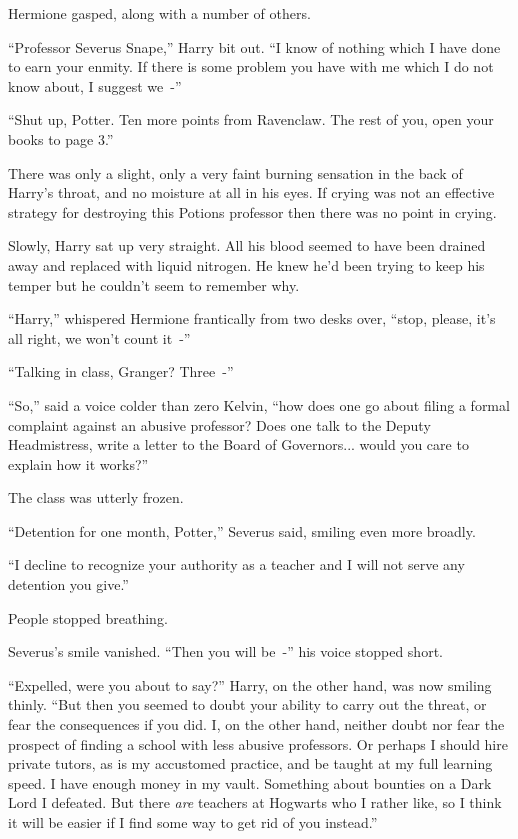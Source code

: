 Hermione gasped, along with a number of others.

``Professor Severus Snape,'' Harry bit out. ``I know of nothing which I have done to earn your enmity. If there is some problem you have with me which I do not know about, I suggest we~-''

``Shut up, Potter. Ten more points from Ravenclaw. The rest of you, open your books to page 3.''

There was only a slight, only a very faint burning sensation in the back of Harry's throat, and no moisture at all in his eyes. If crying was not an effective strategy for destroying this Potions professor then there was no point in crying.

Slowly, Harry sat up very straight. All his blood seemed to have been drained away and replaced with liquid nitrogen. He knew he'd been trying to keep his temper but he couldn't seem to remember why.

``Harry,'' whispered Hermione frantically from two desks over, ``stop, please, it's all right, we won't count it~-''

``Talking in class, Granger? Three~-''

``So,'' said a voice colder than zero Kelvin, ``how does one go about filing a formal complaint against an abusive professor? Does one talk to the Deputy Headmistress, write a letter to the Board of Governors... would you care to explain how it works?''

The class was utterly frozen.

``Detention for one month, Potter,'' Severus said, smiling even more broadly.

``I decline to recognize your authority as a teacher and I will not serve any detention you give.''

People stopped breathing.

Severus's smile vanished. ``Then you will be~-'' his voice stopped short.

``Expelled, were you about to say?'' Harry, on the other hand, was now smiling thinly. ``But then you seemed to doubt your ability to carry out the threat, or fear the consequences if you did. I, on the other hand, neither doubt nor fear the prospect of finding a school with less abusive professors. Or perhaps I should hire private tutors, as is my accustomed practice, and be taught at my full learning speed. I have enough money in my vault. Something about bounties on a Dark Lord I defeated. But there \emph{are} teachers at Hogwarts who I rather like, so I think it will be easier if I find some way to get rid of you instead.''

